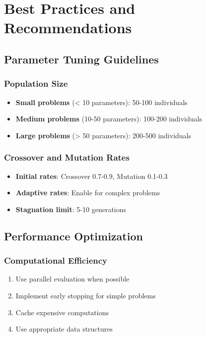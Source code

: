 \documentclass[12pt,a4paper]{article}
\begin{document}
\section{Best Practices and Recommendations}

\subsection{Parameter Tuning Guidelines}

\subsubsection{Population Size}
\begin{itemize}
    \item \textbf{Small problems} (< 10 parameters): 50-100 individuals
    \item \textbf{Medium problems} (10-50 parameters): 100-200 individuals
    \item \textbf{Large problems} (> 50 parameters): 200-500 individuals
\end{itemize}

\subsubsection{Crossover and Mutation Rates}
\begin{itemize}
    \item \textbf{Initial rates}: Crossover 0.7-0.9, Mutation 0.1-0.3
    \item \textbf{Adaptive rates}: Enable for complex problems
    \item \textbf{Stagnation limit}: 5-10 generations
\end{itemize}

\subsection{Performance Optimization}

\subsubsection{Computational Efficiency}
\begin{enumerate}
    \item Use parallel evaluation when possible
    \item Implement early stopping for simple problems
    \item Cache expensive computations
    \item Use appropriate data structures
\end{enumerate}
\end{document}
